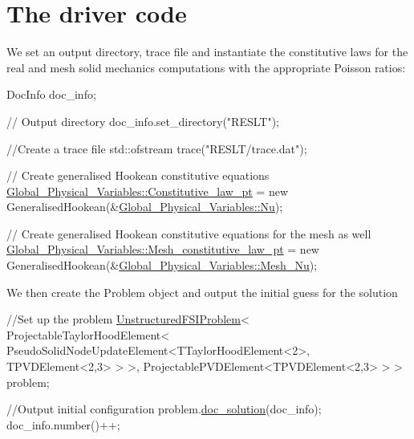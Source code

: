  

\hypertarget{index_main}{}\section{The driver code}\label{index_main}
We set an output directory, trace file and instantiate the constitutive laws for the real and mesh solid mechanics computations with the appropriate Poisson ratios\+:

 
\begin{DoxyCodeInclude}
 DocInfo doc\_info;

 \textcolor{comment}{// Output directory}
 doc\_info.set\_directory(\textcolor{stringliteral}{"RESLT"});

 \textcolor{comment}{//Create a trace file}
 std::ofstream trace(\textcolor{stringliteral}{"RESLT/trace.dat"});
 
 \textcolor{comment}{// Create generalised Hookean constitutive equations}
 \hyperlink{namespaceGlobal__Physical__Variables_a2a37fb040c832ee7a086bb13bb02a100}{Global\_Physical\_Variables::Constitutive\_law\_pt} = 
  \textcolor{keyword}{new} GeneralisedHookean(&\hyperlink{namespaceGlobal__Physical__Variables_a3962c36313826b19f216f6bbbdd6a477}{Global\_Physical\_Variables::Nu});

 \textcolor{comment}{// Create generalised Hookean constitutive equations for the mesh as well}
 \hyperlink{namespaceGlobal__Physical__Variables_aac1b52d0b82bc48d24dfcb031d9dc25f}{Global\_Physical\_Variables::Mesh\_constitutive\_law\_pt} = 
  \textcolor{keyword}{new} GeneralisedHookean(&\hyperlink{namespaceGlobal__Physical__Variables_a0f1535b448627cbfa0acfb742120d96f}{Global\_Physical\_Variables::Mesh\_Nu});

\end{DoxyCodeInclude}


We then create the {\ttfamily Problem} object and output the initial guess for the solution


\begin{DoxyCodeInclude}
 
 \textcolor{comment}{//Set up the problem}
 \hyperlink{classUnstructuredFSIProblem}{UnstructuredFSIProblem}<
 ProjectableTaylorHoodElement<
 PseudoSolidNodeUpdateElement<TTaylorHoodElement<2>, TPVDElement<2,3> > >, 
  ProjectablePVDElement<TPVDElement<2,3> > > problem;

\textcolor{comment}{//Output initial configuration}
problem.\hyperlink{classUnstructuredFSIProblem_a15f581318b505de07f50bd570da8c8d0}{doc\_solution}(doc\_info);
doc\_info.number()++;

\end{DoxyCodeInclude}


